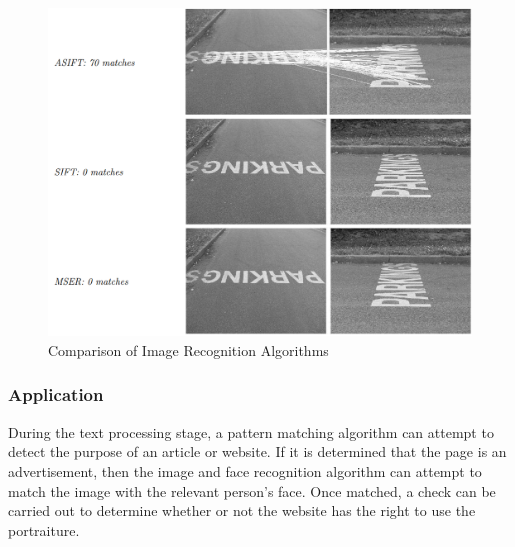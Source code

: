       \begin{figure}
        \centering
        \begin{minipage}{12cm}
          \centering
          \includegraphics[width=12cm]{inc/image_recognition_comparison.png}
          \caption{Comparison of Image Recognition Algorithms}
          \label{fig:image_recognition_comparison}
        \end{minipage}
      \end{figure}

    \subsubsection{Application}

      During the text processing stage, a pattern matching algorithm can attempt to detect the purpose of an article or website. If it is determined that the page is an advertisement, then the image and face recognition algorithm can attempt to match the image with the relevant person's face. Once matched, a check can be carried out to determine whether or not the website has the right to use the portraiture.
